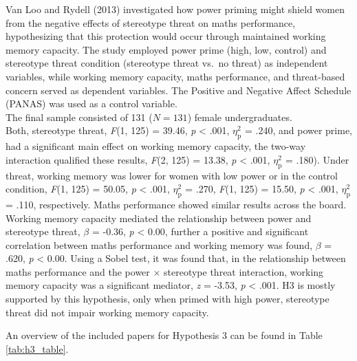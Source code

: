 \documentclass[
  stu, a4paper,floatsintext]{apa7}
\begin{document}
Van Loo and Rydell (2013) investigated how power priming might shield women from the negative effects of stereotype threat on maths performance, hypothesizing that this protection would occur through maintained working memory capacity.
The study employed power prime (high, low, control) and stereotype threat condition (stereotype threat vs.~no threat) as independent variables, while working memory capacity, maths performance, and threat-based concern served as dependent variables.
The Positive and Negative Affect Schedule (PANAS) was used as a control variable.\\
The final sample consisted of 131 (\(N = 131\)) female undergraduates.\\
Both, stereotype threat, \emph{F}(1, 125) = 39.46, \emph{p} \textless{} .001, \(\eta^{2}_{\text{p}}\) = .240, and power prime, had a significant main effect on working memory capacity, the two-way interaction qualified these results, \emph{F}(2, 125) = 13.38, \emph{p} \textless{} .001, \(\eta^{2}_{\text{p}}\) = .180).
Under threat, working memory was lower for women with low power or in the control condition, \emph{F}(1, 125) = 50.05, \emph{p} \textless{} .001, \(\eta^{2}_{\text{p}}\) = .270, \emph{F}(1, 125) = 15.50, \emph{p} \textless{} .001, \(\eta^{2}_{\text{p}}\) = .110, respectively.
Maths performance showed similar results across the board.
Working memory capacity mediated the relationship between power and stereotype threat, \(\beta\) = -0.36, \emph{p} \textless{} 0.00, further a positive and significant correlation between maths performance and working memory was found, \(\beta\) = .620, \emph{p} \textless{} 0.00.
Using a Sobel test, it was found that, in the relationship between maths performance and the power \(\times\) stereotype threat interaction, working memory capacity was a significant mediator, \emph{z} = -3.53, \emph{p} \textless{} .001.
H3 is mostly supported by this hypothesis, only when primed with high power, stereotype threat did not impair working memory capacity.

An overview of the included papers for Hypothesis 3 can be found in Table \ref{tab:h3_table}.
\end{document}
